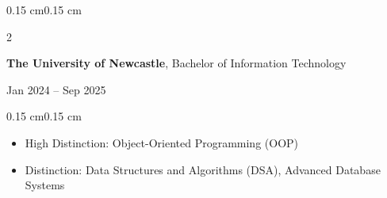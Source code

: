 \documentclass[10pt, letterpaper]{article}
\newenvironment{highlights}{
    \begin{itemize}[
        topsep=0.08 cm,
        parsep=0.05 cm,
        partopsep=0pt,
        itemsep=0pt,
        leftmargin=0.4 cm
    ]
}{
    \end{itemize}
}
\newenvironment{onecolentry}{
    \begin{adjustwidth}{0.15 cm}{0.15 cm}
}{
    \end{adjustwidth}
}
\newenvironment{twocolentry}[2][]{
    \onecolentry
    \def\secondColumn{#2}
    \setcolumnwidth{\fill, 4.5 cm}
    \begin{paracol}{2}
}{
    \switchcolumn \raggedleft \secondColumn
    \end{paracol}
    \endonecolentry
}
\begin{document}
        \begin{twocolentry}{
            Jan 2024 -- Sep 2025
        }
            \textbf{The University of Newcastle}, Bachelor of Information Technology
        \end{twocolentry}  
        \vspace{0.08 cm}
        \begin{onecolentry}
            \begin{highlights}
                \item High Distinction: Object-Oriented Programming (OOP)
                \item Distinction: Data Structures and Algorithms (DSA), Advanced Database Systems
            \end{highlights}
        \end{onecolentry}
\end{document}
